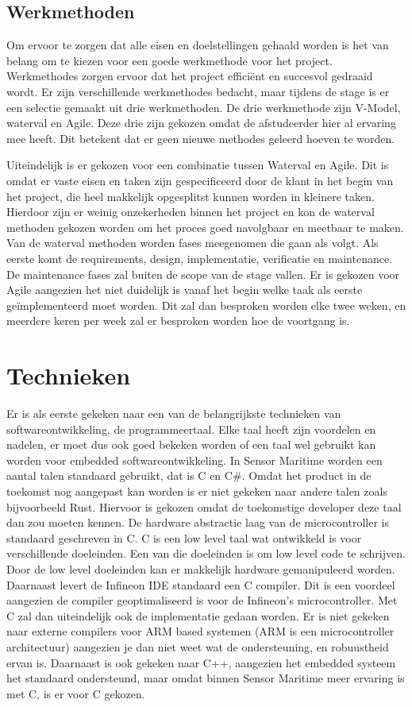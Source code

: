 \subsection{Werkmethoden}
Om ervoor te zorgen dat alle eisen en doelstellingen gehaald worden is het van belang om te kiezen voor een goede werkmethode voor het project. Werkmethodes zorgen ervoor dat het project efficiënt en succesvol gedraaid wordt. Er zijn verschillende werkmethodes bedacht, maar tijdens de stage is er een selectie gemaakt uit drie werkmethoden. De drie werkmethode zijn V-Model, waterval en Agile. Deze drie zijn gekozen omdat de afstudeerder hier al ervaring mee heeft. Dit betekent dat er geen nieuwe methodes geleerd hoeven te worden. \newline

\noindent Uiteindelijk is er gekozen voor een combinatie tussen Waterval en Agile. Dit is omdat er vaste eisen en taken zijn gespecificeerd door de klant in het begin van het project, die heel makkelijk opgesplitst kunnen worden in kleinere taken. Hierdoor zijn er weinig onzekerheden binnen het project en kon de waterval methoden gekozen worden om het proces goed navolgbaar en meetbaar te maken. Van de waterval methoden worden fases meegenomen die gaan als volgt. Als eerste komt de requirements, design, implementatie, verificatie en maintenance. De maintenance fases zal buiten de scope van de stage vallen. Er is gekozen voor Agile aangezien het niet duidelijk is vanaf het begin welke taak als eerste geïmplementeerd moet worden. Dit zal dan besproken worden elke twee weken, en meerdere keren per week zal er besproken worden hoe de voortgang is.




\section{Technieken}
Er is als eerste gekeken naar een van de belangrijkste technieken van softwareontwikkeling, de programmeertaal. Elke taal heeft zijn voordelen en nadelen, er moet dus ook goed bekeken worden of een taal wel gebruikt kan worden voor embedded softwareontwikkeling. In Sensor Maritime worden een aantal talen standaard gebruikt, dat is C en C\#. Omdat het product in de toekomst nog aangepast kan worden is er niet gekeken naar andere talen zoals bijvoorbeeld Rust. Hiervoor is gekozen omdat de toekomstige developer deze taal dan zou moeten kennen. De hardware abstractie laag van de microcontroller is standaard geschreven in C. C is een low level taal wat ontwikkeld is voor verschillende doeleinden. Een van die doeleinden is om low level code te schrijven. Door de low level doeleinden kan er makkelijk hardware gemanipuleerd worden. Daarnaast levert de Infineon IDE standaard een C compiler. Dit is een voordeel aangezien de compiler geoptimaliseerd is voor de Infineon's microcontroller. Met C zal dan uiteindelijk ook de implementatie gedaan worden. Er is niet gekeken naar externe compilers voor ARM based systemen (ARM is een microcontroller architectuur) aangezien je dan niet weet wat de ondersteuning, en robuustheid ervan is. Daarnaast is ook gekeken naar C++, aangezien het embedded systeem het standaard ondersteund, maar omdat binnen Sensor Maritime meer ervaring is met C, is er voor C gekozen. 

